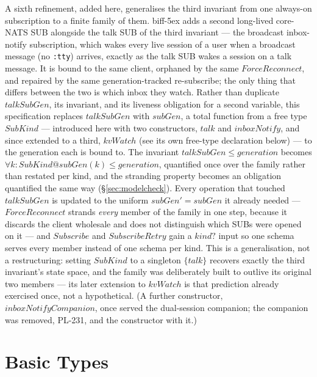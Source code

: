 \documentclass[a4paper,10pt,fleqn]{article}
\begin{document}
A sixth refinement, added here, generalises the third invariant from one
always-on subscription to a finite family of them.  biff-5ex adds a second
long-lived core-NATS SUB alongside the talk SUB of the third
invariant --- the broadcast inbox-notify subscription, which wakes every
live session of a user when a broadcast message (no \texttt{:tty}) arrives,
exactly as the talk SUB wakes a session on a talk message.  It is bound to
the same client, orphaned by the same $ForceReconnect$, and repaired by the
same generation-tracked re-subscribe; the only thing that differs between
the two is which inbox they watch.  Rather than duplicate $talkSubGen$,
its invariant, and its liveness obligation for a second variable, this
specification replaces $talkSubGen$ with $subGen$, a total function from a
free type $SubKind$ --- introduced here with two constructors, $talk$ and
$inboxNotify$, and since extended to a third, $kvWatch$ (see its own
free-type declaration below) --- to the generation each is bound to.  The
invariant $talkSubGen \leq generation$ becomes $\forall k : SubKind @
subGen(k) \leq generation$, quantified once over the family rather than
restated per kind, and the stranding property becomes an obligation
quantified the same way (\S\ref{sec:modelcheck}).  Every operation that
touched $talkSubGen$ is updated to the uniform $subGen' = subGen$ it
already needed --- $ForceReconnect$ strands \emph{every} member of the
family in one step, because it discards the client wholesale and does not
distinguish which SUBs were opened on it --- and $Subscribe$ and
$SubscribeRetry$ gain a $kind?$ input so one schema serves every member
instead of one schema per kind.  This is a generalisation, not a
restructuring: setting $SubKind$ to a singleton $\{ talk \}$ recovers
exactly the third invariant's state space, and the family was
deliberately built to outlive its original two members --- its later
extension to $kvWatch$ is that prediction already exercised once, not a
hypothetical.  (A further constructor, $inboxNotifyCompanion$, once
served the dual-session companion; the companion was removed, PL-231, and
the constructor with it.)

\section{Basic Types}

\begin{zed}
\end{zed}
\end{document}
